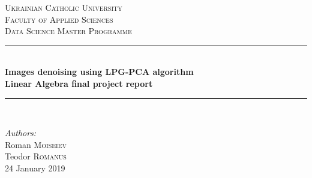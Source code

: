\begin{titlepage}

\newcommand{\HRule}{\rule{\linewidth}{0.5mm}} %

\center %
 

\textsc{\LARGE Ukrainian Catholic University}\\[1cm] %
\textsc{\Large  Faculty of Applied Sciences}\\[0.5cm] %
\textsc{\large Data Science Master Programme}\\[0.5cm] %

\vspace*{1cm}

\HRule \\[0.4cm]
{ \huge \bfseries Images denoising using LPG-PCA algorithm}\\[10pt]
{\Large \bfseries Linear Algebra final project report}\\[0.4cm] %
\HRule \\[1cm]
 
\vspace*{1cm}

\Large \emph{Authors:}\\
Roman \textsc{Moiseiev}\\Teodor \textsc{Romanus}\\[1cm] %

\vspace*{1cm}
{\large 24 January 2019}\\[2cm] %


\end{titlepage}
